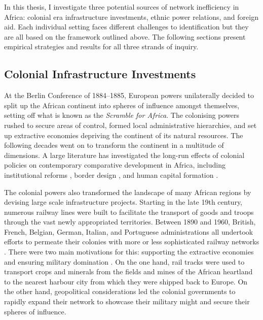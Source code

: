 \documentclass[11pt, oneside]{article}   	%
\begin{document}
In this thesis, I investigate three potential sources of network inefficiency in Africa: colonial era infrastructure investments, ethnic power relations, and foreign aid. Each individual setting faces different challenges to identification but they are all based on the framework outlined above. The following sections present empirical strategies and results for all three strands of inquiry.

\subsection{Colonial Infrastructure Investments}
At the Berlin Conference of 1884--1885, European powers unilaterally decided to split up the African continent into spheres of influence amongst themselves, setting off what is known as the \emph{Scramble for Africa}. The colonising powers rushed to secure areas of control, formed local administrative hierarchies, and set up extractive economies depriving the continent of its natural resources. The following decades went on to transform the continent in a multitude of dimensions. A large literature has investigated the long-run effects of colonial policies on contemporary comparative development in Africa, including institutional reforms \citep{Acemoglu_ColonialOriginsComparative_2001,acemoglu_reversal_2002}, border design \citep{michalopoulos_long-run_2016}, and human capital formation \citep{Wantchekon_EducationHumanCapital_2015}.

The colonial powers also transformed the landscape of many African regions by devising large scale infrastructure projects. Starting in the late 19th century, numerous railway lines were built to facilitate the transport of goods and troops through the vast newly appropriated territories. Between 1890 and 1960, British, French, Belgian, German, Italian, and Portuguese administrations all undertook efforts to permeate their colonies with more or less sophisticated railway networks \citep{jedwab_permanent_2016}. There were two main motivations for this: supporting the extractive economies and ensuring military domination \citep{jedwab_history_2017}. On the one hand, rail tracks were used to transport crops and minerals from the fields and mines of the African heartland to the nearest harbour city from which they were shipped back to Europe. On the other hand, geopolitical considerations led the colonial governments to rapidly expand their network to showcase their military might and secure their spheres of influence.
\end{document}
